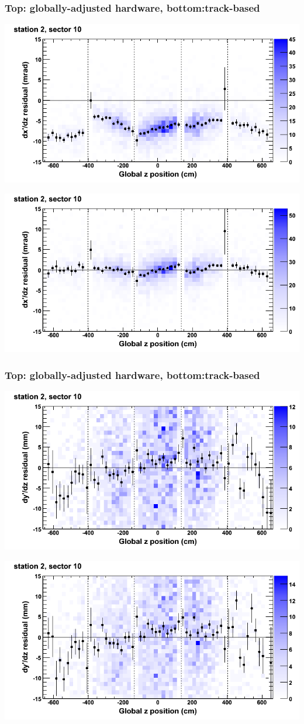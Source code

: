 \documentclass[compress]{beamer}
\begin{document}
\begin{frame}
\frametitle{Top: globally-adjusted hardware, bottom:track-based}
\includegraphics[width=0.7\linewidth]{NOV4_mapplots_HW/DTvsz_st2sec10_dxdz.png}

\includegraphics[width=0.7\linewidth]{NOV4_mapplots/DTvsz_st2sec10_dxdz.png}
\end{frame}

\begin{frame}
\frametitle{Top: globally-adjusted hardware, bottom:track-based}
\includegraphics[width=0.7\linewidth]{NOV4_mapplots_HW/DTvsz_st2sec10_dydz.png}

\includegraphics[width=0.7\linewidth]{NOV4_mapplots/DTvsz_st2sec10_dydz.png}
\end{frame}
\end{document}
